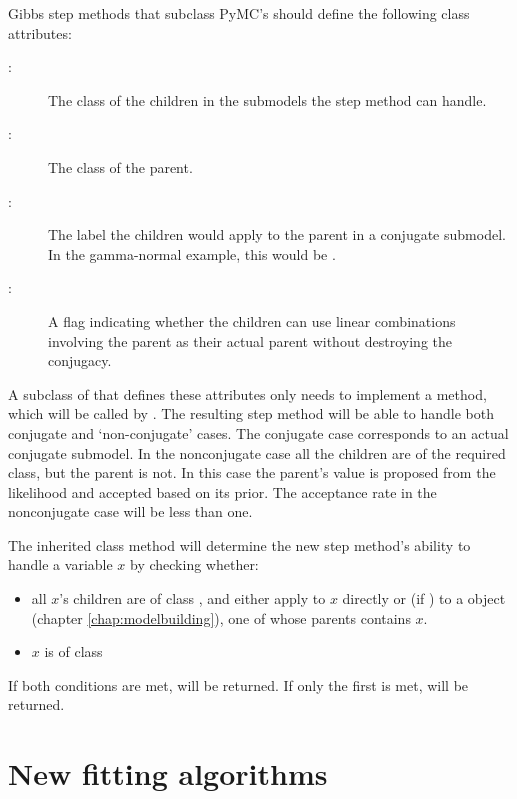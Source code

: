 Gibbs step methods that subclass PyMC's  should define the following class attributes:
\begin{description}
   \item[:] The class of the children in the submodels the step method can handle.
   \item[:] The class of the parent.
   \item[:] The label the children would apply to the parent in a conjugate submodel. In the gamma-normal example, this would be .
   \item[:] A flag indicating whether the children can use linear combinations involving the parent as their actual parent without destroying the conjugacy.
\end{description}

A subclass of  that defines these attributes only needs to implement a  method, which will be called by . The resulting step method will be able to handle both conjugate and `non-conjugate' cases. The conjugate case corresponds to an actual conjugate submodel. In the nonconjugate case all the children are of the required class, but the parent is not. In this case the parent's value is proposed from the likelihood and accepted based on its prior. The acceptance rate in the nonconjugate case will be less than one.

The inherited class method  will determine the new step method's ability to handle a variable $x$ by checking whether:
\begin{itemize}
   \item all $x$'s children are of class , and either apply  to $x$ directly or (if ) to a  object (chapter \ref{chap:modelbuilding}), one of whose parents contains $x$.
   \item $x$ is of class 
\end{itemize}
If both conditions are met,  will be returned. If only the first is met,  will be returned.

\hypertarget{custom-model}{}
\section{New fitting algorithms} \label{custom-model}

